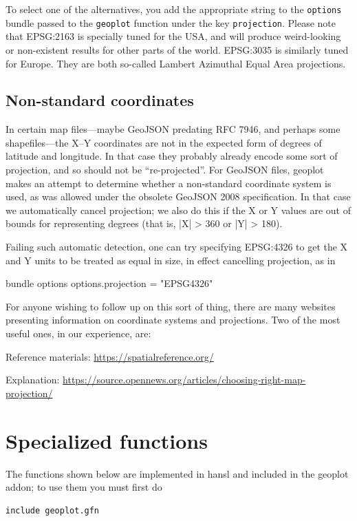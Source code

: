 \documentclass{article}
\newcommand{\myappendix}[1]{%
\addtocounter{appcount}{1}
\section{#1}}
\begin{document}
To select one of the alternatives, you add the appropriate string to
the \texttt{options} bundle passed to the \texttt{geoplot} function
under the key \texttt{projection}. Please note that \textsf{EPSG:2163}
is specially tuned for the USA, and will produce weird-looking or
non-existent results for other parts of the world. \textsf{EPSG:3035}
is similarly tuned for Europe. They are both so-called Lambert
Azimuthal Equal Area projections.

\subsection*{Non-standard coordinates}

In certain map files---maybe GeoJSON predating RFC 7946, and perhaps
some shapefiles---the X--Y coordinates are not in the expected form of
degrees of latitude and longitude. In that case they probably already
encode some sort of projection, and so should not be ``re-projected''.
For GeoJSON files, \textsf{geoplot} makes an attempt to determine
whether a non-standard coordinate system is used, as was allowed under
the obsolete GeoJSON 2008 specification. In that case we automatically
cancel projection; we also do this if the X or Y values are out of
bounds for representing degrees (that is, |X| > 360 or |Y| > 180).

Failing such automatic detection, one can try specifying
\textsf{EPSG:4326} to get the X and Y units to be treated as equal in
size, in effect cancelling projection, as in
\begin{code}
bundle options
options.projection = "EPSG4326"
\end{code}

For anyone wishing to follow up on this sort of thing, there are many
websites presenting information on coordinate systems and
projections. Two of the most useful ones, in our experience, are:

Reference materials: \url{https://spatialreference.org/}

Explanation:
\url{https://source.opennews.org/articles/choosing-right-map-projection/}

\clearpage
\myappendix{Specialized functions}
\label{app:special}

The functions shown below are implemented in hansl and included in the
\textsf{geoplot} addon; to use them you must first do
\begin{verbatim}
include geoplot.gfn
\end{verbatim}
\end{document}
